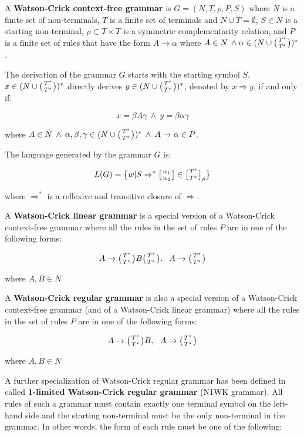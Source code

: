 A \textbf{Watson-Crick context-free grammar} is $G = (N, T, \rho, P, S)$ where $N$ is a finite set of non-terminals, $T$ is a finite set of terminals and $N \cup T = \emptyset$, $S \in N$ is a starting non-terminal, $\rho \subset T \times T$ is a symmetric complementarity relation, and $P$ is a finite set of rules that have the form $A \rightarrow \alpha$ where $A \in N \: \wedge \alpha \in (N \cup \wkpair{T^*}{T^*})^*$.

The derivation of the grammar $G$ starts with the starting symbol $S$. $x \in (N \cup  \wkpair{T^*}{T^*})^*$ directly derives $y \in (N \cup \wkpair{T^*}{T^*})^*$, denoted by $x \Rightarrow y$, if and only if:

$$x = \beta A \gamma \: \wedge \: y = \beta \alpha \gamma$$

where $A \in N \: \wedge \: \alpha, \beta, \gamma \in (N \cup \wkpair{T^*}{T^*})^* \: \wedge \: A \rightarrow \alpha \in P$.

The language generated by the grammar $G$ is:

$$L(G) = \big\{ w| S \Rightarrow^* \wkdomain{w_1}{w_2} \in \wkdomain{T^*}{T^*}_{\rho} \big\}$$

where $\Rightarrow^*$ is a reflexive and transitive closure of $\Rightarrow$.

A \textbf{Watson-Crick linear grammar} is a special version of a Watson-Crick context-free grammar where all the rules in the set of rules $P$ are in one of the following forms:

$$A \rightarrow \wkpair{T^*}{T^*} B \wkpair{T^*}{T^*}, \:\:\: A \rightarrow \wkpair{T^*}{T^*}$$

where $A, B \in N$

A \textbf{Watson-Crick regular grammar} is also a special version of a Watson-Crick context-free grammar (and of a Watson-Crick linear grammar) where all the rules in the set of rules $P$ are in one of the following forms:

$$A \rightarrow \wkpair{T^*}{T^*} B, \:\:\: A \rightarrow \wkpair{T^*}{T^*}$$

where $A, B \in N$

A further specialization of Watson-Crick regular grammar has been defined in \cite{REG_GRAMMAR} called \textbf{1-limited Watson-Crick regular grammar} (N1WK grammar). All rules of such a grammar must contain exactly one terminal symbol on the left-hand side and the starting non-terminal must be the only non-terminal in the grammar. In other words, the form of each rule must be one of the following:

